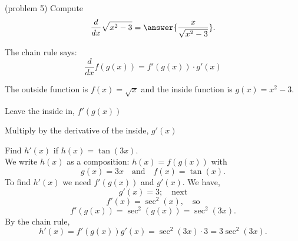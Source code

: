 \documentclass[handout]{ximera}
\begin{document}
\begin{center}
\begin{foldable}
\end{foldable}
\end{center}



\begin{problem}(problem 5)
  Compute
  \[
  \frac{d}{dx} \sqrt{x^2 - 3} = \answer{\frac{x}{\sqrt{x^2 - 3}}}.
  \]
  
    \begin{hint}
      The chain rule says:
      \[
      \frac{d}{dx} f(g(x)) = f'(g(x))\cdot g'(x)
      \]
    \end{hint}
    \begin{hint}
      The outside function is $f(x) = \sqrt{x}$ and the inside
      function is $g(x) = x^2 - 3$.
    \end{hint}
    
    \begin{hint}
		  Leave the inside in, $f'(g(x))$
		\end{hint}
		\begin{hint}
		  Multiply by the derivative of the inside, $g'(x)$
		\end{hint}
		
\end{problem}




\begin{example}[example 6]

Find $h'(x)$ if $h(x) = \tan(3x)$.\\
We write $h(x)$ as a composition: $h(x)=f(g(x))$ with 
\[
g(x) = 3x  \quad \text{and} \quad  f(x) =\tan(x).
\]
To find $h'(x)$ we need $f'(g(x))$ and $g'(x)$.  We have, 
\[
g'(x) =3; \quad \text{next} 
\]
\[
f'(x) =\sec^2(x) , \quad \text{so}
\]
\[
f'(g(x)) = \sec^2(g(x)) = \sec^2(3x).
\]
By the chain rule, 
\[
h'(x) = f'(g(x))g'(x) = \sec^2(3x) \cdot 3= 3\sec^2(3x).
\]
\end{example}


\begin{center}
\begin{foldable}
\end{foldable}
\end{center}
\end{document}
